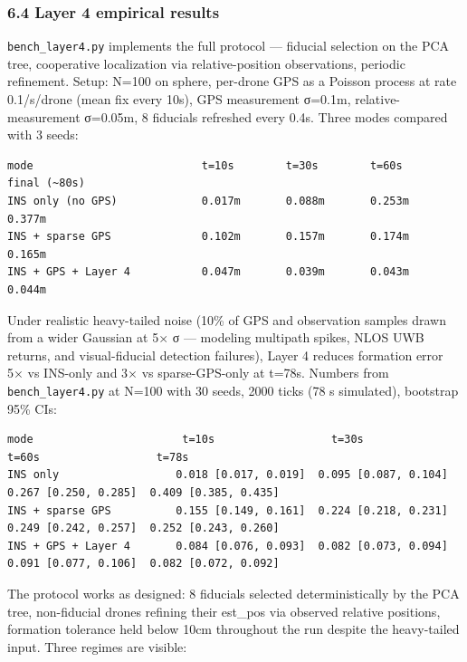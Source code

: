 \subsubsection{6.4 Layer 4 empirical
results}\label{layer-4-empirical-results}

\texttt{bench\_layer4.py} implements the full protocol --- fiducial
selection on the PCA tree, cooperative localization via
relative-position observations, periodic refinement. Setup: N=100 on
sphere, per-drone GPS as a Poisson process at rate 0.1/s/drone (mean fix
every 10s), GPS measurement σ=0.1m, relative-measurement σ=0.05m, 8
fiducials refreshed every 0.4s. Three modes compared with 3 seeds:

\begin{verbatim}
mode                          t=10s        t=30s        t=60s        final (~80s)
INS only (no GPS)             0.017m       0.088m       0.253m       0.377m
INS + sparse GPS              0.102m       0.157m       0.174m       0.165m
INS + GPS + Layer 4           0.047m       0.039m       0.043m       0.044m
\end{verbatim}

Under realistic heavy-tailed noise (10\% of GPS and observation samples
drawn from a wider Gaussian at 5× σ --- modeling multipath spikes, NLOS
UWB returns, and visual-fiducial detection failures), Layer 4 reduces
formation error 5× vs INS-only and 3× vs sparse-GPS-only at t=78s.
Numbers from \texttt{bench\_layer4.py} at N=100 with 30 seeds, 2000
ticks (78 s simulated), bootstrap 95\% CIs:

\begin{verbatim}
mode                       t=10s                  t=30s                  t=60s                  t=78s
INS only                  0.018 [0.017, 0.019]  0.095 [0.087, 0.104]  0.267 [0.250, 0.285]  0.409 [0.385, 0.435]
INS + sparse GPS          0.155 [0.149, 0.161]  0.224 [0.218, 0.231]  0.249 [0.242, 0.257]  0.252 [0.243, 0.260]
INS + GPS + Layer 4       0.084 [0.076, 0.093]  0.082 [0.073, 0.094]  0.091 [0.077, 0.106]  0.082 [0.072, 0.092]
\end{verbatim}

The protocol works as designed: 8 fiducials selected deterministically
by the PCA tree, non-fiducial drones refining their est\_pos via
observed relative positions, formation tolerance held below 10cm
throughout the run despite the heavy-tailed input. Three regimes are
visible:

